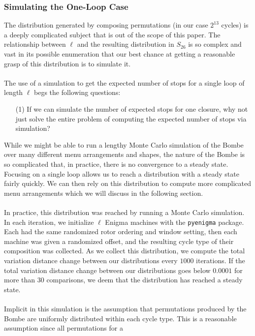 \subsubsection{Simulating the One-Loop Case}
The distribution generated by composing permutations (in our case
$2^{13}$ cycles) is a deeply complicated subject that is out of the
scope of this paper. The relationship between $\ell$ and the
resulting distribution in $S_{26}$ is so complex and vast in its
possible enumeration that our best chance at getting a reasonable
grasp of this distribution is to simulate it.
\\\\The use of a simulation to get the expected number of stops for a
single loop of length $\ell$ begs the following questions:
\begin{enumerate}
  \item[(1)] If we can simulate the number of expected stops for one
    closure, why not just solve the entire problem of computing the
    expected number of stops via simulation?
\end{enumerate}
While we might be able to run a lengthy Monte Carlo simulation of the
Bombe over many different menu arrangements and shapes, the nature of
the Bombe is so complicated that, in practice, there is no convergence
to a steady state. Focusing on a single loop allows us to reach a
distribution with a steady state fairly quickly. We can then rely on
this distribution to compute more complicated menu arrangements which
we will discuss in the following section.
\\\\In practice, this distribution was reached by running a Monte
Carlo simulation. In each iteration, we initialize $\ell$ Enigma
machines with the \texttt{pyenigma} package. Each had the same
randomized rotor ordering and window setting, then each machine was
given a randomized offset, and the resulting cycle type of their
composition was collected. As we collect this distribution, we
compute the total variation distance change between our distributions
every $1000$ iterations. If the total variation distance change
between our distributions goes below $0.0001$ for more than $30$
comparisons, we deem that the distribution has reached a steady state.
\\\\Implicit in this simulation is the assumption that permutations
produced by the Bombe are uniformly distributed within each cycle
type. This is a reasonable assumption since all permutations for a
